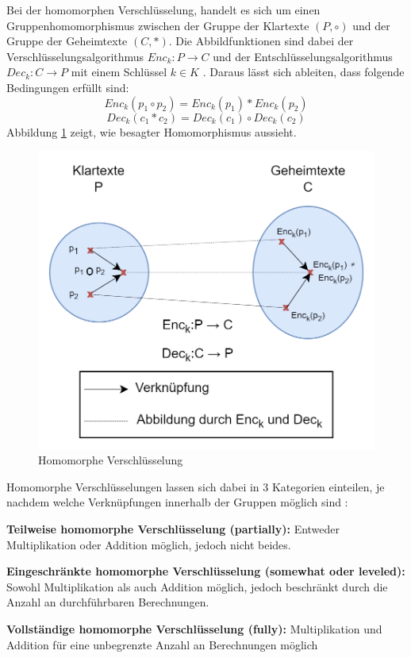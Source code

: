 Bei der homomorphen Verschlüsselung, handelt es sich um einen Gruppenhomomorphismus zwischen der Gruppe der Klartexte $(P,\circ)$ und der Gruppe der Geheimtexte $(C,\ast)$. 
Die Abbildfunktionen sind dabei der Verschlüsselungsalgorithmus $Enc_k:P\to C$ und der Entschlüsselungsalgorithmus $Dec_k:C\to P$ mit einem Schlüssel $k \in K$ \cite{P-98}. 
Daraus lässt sich ableiten, dass folgende Bedingungen erfüllt sind:
\begin{equation*}
    Enc_k(p_1 \circ p_2) = Enc_k(p_1) \ast Enc_k(p_2) 
\end{equation*}
\begin{equation*}
Dec_k(c_1 \ast c_2) = Dec_k(c_1) \circ Dec_k(c_2)
\end{equation*}
Abbildung \ref{fig:homo_enc} zeigt, wie besagter Homomorphismus aussieht.


\begin{figure}[!htb]
    \centering
    \includegraphics[width=12cm]{figures/homo_enc.png}
    \caption{Homomorphe Verschlüsselung}
    \label{fig:homo_enc}
\end{figure} 

Homomorphe Verschlüsselungen lassen sich dabei in 3 Kategorien einteilen, je nachdem welche Verknüpfungen innerhalb der Gruppen möglich sind \cite{P-42}:
\begin{compactitem}
\item \textbf{Teilweise homomorphe Verschlüsselung (partially):} Entweder Multiplikation oder Addition möglich, jedoch nicht beides.
\item \textbf{Eingeschränkte homomorphe Verschlüsselung (somewhat oder leveled):} Sowohl Multiplikation als auch Addition möglich, jedoch beschränkt durch die Anzahl an durchführbaren Berechnungen. 
\item \textbf{Vollständige homomorphe Verschlüsselung (fully):} Multiplikation und Addition für eine unbegrenzte Anzahl an Berechnungen möglich
\end{compactitem}

